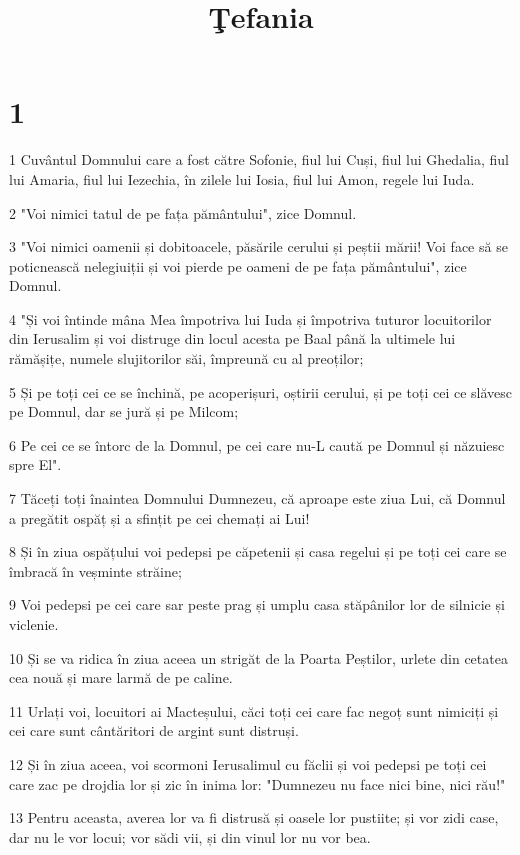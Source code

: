 

\title{Ţefania}


\chapter{1}

\par 1 Cuvântul Domnului care a fost către Sofonie, fiul lui Cuși, fiul lui Ghedalia, fiul lui Amaria, fiul lui Iezechia, în zilele lui Iosia, fiul lui Amon, regele lui Iuda.
\par 2 "Voi nimici tatul de pe fața pământului", zice Domnul.
\par 3 "Voi nimici oamenii și dobitoacele, păsările cerului și peștii mării! Voi face să se poticnească nelegiuiții și voi pierde pe oameni de pe fața pământului", zice Domnul.
\par 4 "Și voi întinde mâna Mea împotriva lui Iuda și împotriva tuturor locuitorilor din Ierusalim și voi distruge din locul acesta pe Baal până la ultimele lui rămășițe, numele slujitorilor săi, împreună cu al preoților;
\par 5 Și pe toți cei ce se închină, pe acoperișuri, oștirii cerului, și pe toți cei ce slăvesc pe Domnul, dar se jură și pe Milcom;
\par 6 Pe cei ce se întorc de la Domnul, pe cei care nu-L caută pe Domnul și năzuiesc spre El".
\par 7 Tăceți toți înaintea Domnului Dumnezeu, că aproape este ziua Lui, că Domnul a pregătit ospăț și a sfințit pe cei chemați ai Lui!
\par 8 Și în ziua ospățului voi pedepsi pe căpetenii și casa regelui și pe toți cei care se îmbracă în veșminte străine;
\par 9 Voi pedepsi pe cei care sar peste prag și umplu casa stăpânilor lor de silnicie și viclenie.
\par 10 Și se va ridica în ziua aceea un strigăt de la Poarta Peștilor, urlete din cetatea cea nouă și mare larmă de pe caline.
\par 11 Urlați voi, locuitori ai Macteșului, căci toți cei care fac negoț sunt nimiciți și cei care sunt cântăritori de argint sunt distruși.
\par 12 Și în ziua aceea, voi scormoni Ierusalimul cu făclii și voi pedepsi pe toți cei care zac pe drojdia lor și zic în inima lor: "Dumnezeu nu face nici bine, nici rău!"
\par 13 Pentru aceasta, averea lor va fi distrusă și oasele lor pustiite; și vor zidi case, dar nu le vor locui; vor sădi vii, și din vinul lor nu vor bea.
